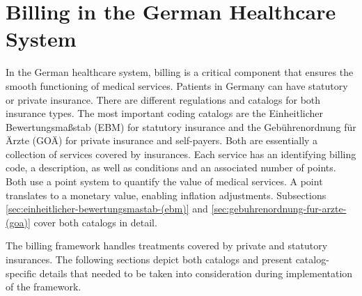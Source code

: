 \chapter{Billing in the German Healthcare System}\label{ch:billing-in-the-german-healthcare-system}

In the German healthcare system, billing is a critical component that ensures the smooth functioning of medical services.
Patients in Germany can have statutory or private insurance.
There are different regulations and catalogs for both insurance types.
The most important coding catalogs are the Einheitlicher Bewertungsmaßstab (EBM) for statutory insurance and the Gebührenordnung für Ärzte (GOÄ) for private insurance and self-payers.
Both are essentially a collection of services covered by insurances.
Each service has an identifying billing code, a description, as well as conditions and an associated number of points.
Both use a point system to quantify the value of medical services.
A point translates to a monetary value, enabling inflation adjustments.
Subsections \ref{sec:einheitlicher-bewertungsmastab-(ebm)} and \ref{sec:gebuhrenordnung-fur-arzte-(goa)} cover both catalogs in detail.

The billing framework handles treatments covered by private and statutory insurances.
The following sections depict both catalogs and present catalog-specific details that needed to be taken into consideration during implementation of the framework.



